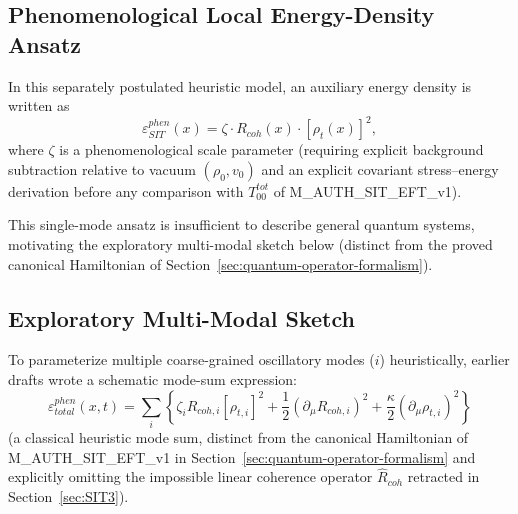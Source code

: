 \documentclass[american,11pt,letterpaper]{article}
\def\mathcal#1{#1}%
\def\mathrm#1{#1}%
\def\texttt#1{#1}%
\begin{document}
\subsection{Phenomenological Local Energy-Density Ansatz}
In this separately postulated heuristic model, an auxiliary energy density is written as
\begin{equation}
    \varepsilon_{\mathrm{SIT}}^{\mathrm{phen}}(x) = \zeta \cdot R_{\mathrm{coh}}(x) \cdot [\rho_t(x)]^2,
    \label{eq:local_energy_density}
\end{equation}
where $\zeta$ is a phenomenological scale parameter (requiring explicit background subtraction relative to vacuum $(\rho_0, v_0)$ and an explicit covariant stress--energy derivation before any comparison with $T_{00}^{\mathrm{tot}}$ of \texttt{M\_AUTH\_SIT\_EFT\_v1}).

This single-mode ansatz is insufficient to describe general quantum systems, motivating the exploratory multi-modal sketch below (distinct from the proved canonical Hamiltonian of Section~\ref{sec:quantum-operator-formalism}).

\subsection{Exploratory Multi-Modal Sketch}
To parameterize multiple coarse-grained oscillatory modes ($i$) heuristically, earlier drafts wrote a schematic mode-sum expression:
\begin{equation}
    \varepsilon_{\mathrm{total}}^{\mathrm{phen}}(x,t) = \sum_i \left\{ \zeta_i R_{\mathrm{coh},i} [\rho_{t,i}]^2 + \frac{1}{2}(\partial_\mu R_{\mathrm{coh},i})^2 + \frac{\kappa}{2}(\partial_\mu \rho_{t,i})^2 \right\}
    \label{eq:full_functional}
\end{equation}
(a classical heuristic mode sum, distinct from the canonical Hamiltonian of \texttt{M\_AUTH\_SIT\_EFT\_v1} in Section~\ref{sec:quantum-operator-formalism} and explicitly omitting the impossible linear coherence operator $\hat{\mathcal{R}}_{\mathrm{coh}}$ retracted in Section~\ref{sec:SIT3}).
\end{document}

